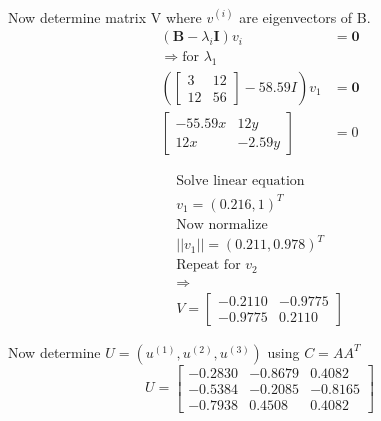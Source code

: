 \documentclass[../Main.tex]{subfiles}
\begin{document}
{\begin{equation*}
\begin{split}
        \end{split}
    \end{equation*}
    Now determine matrix V where \(v^{(i)}\) are eigenvectors of B.
    \begin{equation*}
        \begin{split}
            (\boldsymbol{B} - \lambda_i \boldsymbol{I})v_i &= \boldsymbol{0} \\
            \Rightarrow \text{for } \lambda_1 \\
            (\begin{bmatrix}
                3 & 12\\
                12 & 56
            \end{bmatrix} - 58.59 I)v_1 &= \boldsymbol{0} \\
            \begin{bmatrix}
                -55.59x & 12y\\
                12x & -2.59y
            \end{bmatrix}&= 0 
        \end{split}
    \end{equation*}

    \begin{equation*}
        \begin{split}
            \text{Solve linear equation} \\
            v_1 = (0.216,1)^T \\
            \text{Now normalize} \\
            ||v_1||= (0.211,0.978)^T \\
            \text{Repeat for } v_2 \\
            \Rightarrow \\
            V = \begin{bmatrix}
                -0.2110 & -0.9775\\
                -0.9775 & 0.2110
            \end{bmatrix}
        \end{split}
    \end{equation*}

    Now determine \(U =(u^{(1)}, u^{(2)}, u^{(3)})\) using \(C=AA^T\)
    \begin{equation*}
        U = \begin{bmatrix}
            -0.2830 & -0.8679 & 0.4082\\
            -0.5384 & -0.2085 & -0.8165\\
            -0.7938 & 0.4508 & 0.4082
        \end{bmatrix}
    \end{equation*}

}
\end{document}
